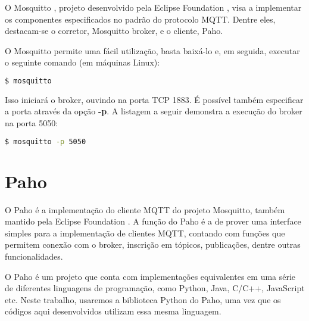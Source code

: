 O Mosquitto \cite{Mosquitto}, projeto desenvolvido pela Eclipse Foundation \cite{Eclipse}, visa a implementar os componentes especificados no padrão do protocolo MQTT. Dentre eles, destacam-se o corretor, Mosquitto broker, e o cliente, Paho.

O Mosquitto permite uma fácil utilização, basta baixá-lo e, em seguida, executar o seguinte comando (em máquinas Linux):

\begin{lstlisting}[language=bash, caption=Execução Mosquitto broker]
    $ mosquitto
\end{lstlisting}

Isso iniciará o broker, ouvindo na porta TCP 1883. É possível também especificar a porta através da opção \textbf{-p}. A listagem a seguir demonstra a execução do broker na porta 5050:

\begin{lstlisting}[language=bash, caption=Execução Mosquitto broker na porta 5050]
    $ mosquitto -p 5050
\end{lstlisting}




\section{Paho}

O Paho é a implementação do cliente MQTT do projeto Mosquitto, também mantido pela Eclipse Foundation \cite{Paho}. A função do Paho é a de prover uma interface simples para a implementação de clientes MQTT, contando com funções que permitem conexão com o broker, inscrição em tópicos, publicações, dentre outras funcionalidades.

O Paho é um projeto que conta com implementações equivalentes em uma série de diferentes linguagens de programação, como Python, Java, C/C++, JavaScript etc. Neste trabalho, usaremos a biblioteca Python do Paho, uma vez que os códigos aqui desenvolvidos utilizam essa mesma linguagem.
